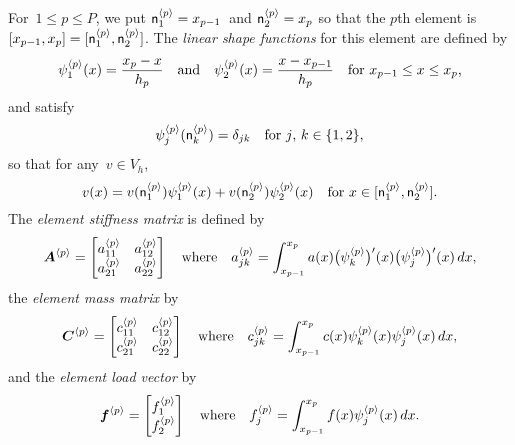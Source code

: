 For~$1\le p\le P$, we put $\mathsf{n}^{\langle p\rangle}_1=x_{p-1}$~and
$\mathsf{n}^{\langle p\rangle}_2=x_p$ so that the $p$th 
element is $[x_{p-1},x_p]=[\mathsf{n}^{\langle p\rangle}_1,\mathsf{n}^{\langle p\rangle}_2]$.  The
\emph{linear shape functions} for this element are defined by
\[
\psi^{\langle p\rangle}_1(x)=\frac{x_p-x}{h_p}
\quad\text{and}\quad
\psi^{\langle p\rangle}_2(x)=\frac{x-x_{p-1}}{h_p}
\quad\text{for $x_{p-1}\le x\le x_p$,}
\]
and satisfy
\[
\psi^{\langle p\rangle}_j(\mathsf{n}^{\langle p\rangle}_k)=\delta_{jk}
    \quad\text{for $j$, $k\in\{1,2\}$,}
\]
so that for any~$v\in V_h$,
\[
v(x)=v(\mathsf{n}^{\langle p\rangle}_1)\psi^{\langle p\rangle}_1(x)
    +v(\mathsf{n}^{\langle p\rangle}_2)\psi^{\langle p\rangle}_2(x)
    \quad\text{for $x\in[\mathsf{n}^{\langle p\rangle}_1,\mathsf{n}^{\langle p\rangle}_2]$.}
\]
The \emph{element stiffness matrix} is defined by
\[
\boldsymbol{A}^{\langle p\rangle}=\begin{bmatrix}
a^{\langle p\rangle}_{11}&a^{\langle p\rangle}_{12}\\
a^{\langle p\rangle}_{21}&a^{\langle p\rangle}_{22}\end{bmatrix}
\quad\text{where}\quad
a^{\langle p\rangle}_{jk}=\int_{x_{p-1}}^{x_p}a(x)\bigl(\psi_k^{\langle p\rangle}\bigr)'(x)
    \bigl(\psi_j^{\langle p\rangle}\bigr)'(x)\,dx,
\]
the \emph{element mass matrix} by
\[
\boldsymbol{C}^{\langle p\rangle}=\begin{bmatrix}
c^{\langle p\rangle}_{11}&c^{\langle p\rangle}_{12}\\
c^{\langle p\rangle}_{21}&c^{\langle p\rangle}_{22}\end{bmatrix}
\quad\text{where}\quad
c^{\langle p\rangle}_{jk}=\int_{x_{p-1}}^{x_p}c(x)\psi_k^{\langle p\rangle}(x) 
    \psi_j^{\langle p\rangle}(x)\,dx,
\]
and the \emph{element load vector} by
\[
\boldsymbol{f}^{\langle p\rangle}=\begin{bmatrix}f^{\langle p\rangle}_1\\ f^{\langle p\rangle}_2\end{bmatrix}
\quad\text{where}\quad
f^{\langle p\rangle}_j=\int_{x_{p-1}}^{x_p}f(x)\psi_j^{\langle p\rangle}(x)\,dx.
\]

